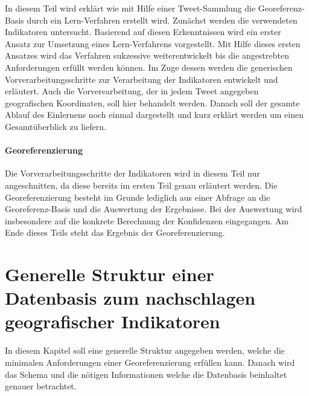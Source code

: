 		In diesem Teil wird erklärt wie mit Hilfe einer Tweet-Sammlung die Georeferenz-Basis durch ein Lern-Verfahren erstellt wird.
		Zunächst werden die verwendeten Indikatoren untersucht.
		Basierend auf diesen Erkenntnissen wird ein erster Ansatz zur Umsetzung eines Lern-Verfahrens vorgestellt.
		Mit Hilfe dieses ersten Ansatzes wird das Verfahren sukzessive weiterentwickelt bis die angestrebten Anforderungen erfüllt werden können.  
		Im Zuge dessen werden die generischen Vorverarbeitungsschritte zur Verarbeitung der Indikatoren entwickelt und erläutert.
		Auch die Vorverearbeitung, der in jedem Tweet angegeben geografischen Koordinaten, soll hier behandelt werden.
		Danach soll der gesamte Ablauf des Einlernens noch einmal dargestellt und kurz erklärt werden um einen Gesamtüberblick zu liefern.
	
	\paragraph{Georeferenzierung} 

		Die Vorverarbeitungsschritte der Indikatoren wird in diesem Teil nur angeschnitten, da diese bereits im ersten Teil genau erläutert werden. 
		Die Georeferenzierung besteht im Grunde lediglich aus einer Abfrage an die Georeferenz-Basis und die Auswertung der Ergebnisse.
		Bei der Auswertung wird insbesondere auf die konkrete Berechnung der Konfidenzen eingegangen.
		Am Ende dieses Teils steht das Ergebnis der Georeferenzierung. 


	\section{Generelle Struktur einer Datenbasis zum nachschlagen geografischer Indikatoren}

		In diesem Kapitel soll eine generelle Struktur angegeben werden, welche die minimalen Anforderungen einer Georeferenzierung erfüllen kann.
		Danach wird das Schema und die nötigen Informationen welche die Datenbasis beinhaltet genauer betrachtet.
		

